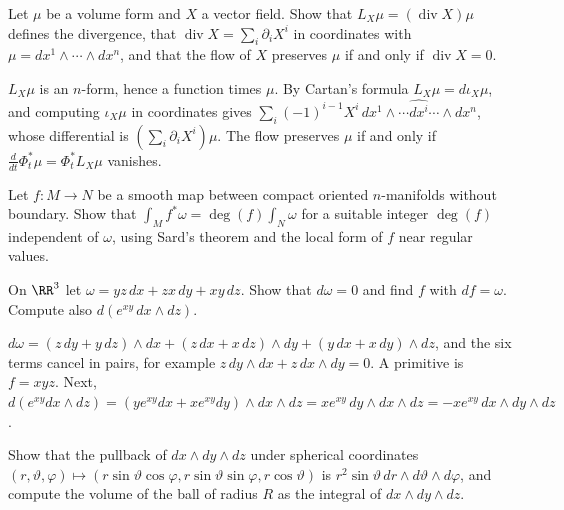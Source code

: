 \begin{exercise}\label{differential-forms:exercise-lie-derivative-volume}
Let $\mu$ be a volume form and $X$ a vector field. Show that $L_X\mu = (\operatorname{div}X)\mu$ defines the divergence, that $\operatorname{div}X = \sum_i\partial_iX^i$ in coordinates with
$\mu = dx^1 \wedge \cdots \wedge dx^n$, and that the flow of $X$ preserves $\mu$ if and only if $\operatorname{div}X = 0$.
\end{exercise}

\begin{solution}
$L_X\mu$ is an $n$-form, hence a function times $\mu$. By Cartan's formula $L_X\mu = d\iota_X\mu$, and computing $\iota_X\mu$ in coordinates gives $\sum_i(-1)^{i-1}X^i\,dx^1 \wedge \cdots \widehat{dx^i} \cdots \wedge dx^n$,
whose differential is $(\sum_i\partial_iX^i)\mu$. The flow preserves $\mu$ if and only if $\frac{d}{dt}\Phi_t^*\mu = \Phi_t^*L_X\mu$ vanishes.
\end{solution}

\begin{exercise}\label{differential-forms:exercise-stokes-degree}
Let $f \colon M \to N$ be a smooth map between compact oriented $n$-manifolds without boundary. Show that $\int_Mf^*\omega = \deg(f)\int_N\omega$ for a suitable integer $\deg(f)$ independent of $\omega$, using
Sard's theorem and the local form of $f$ near regular values.
\end{exercise}

\begin{exercise}\label{differential-forms:exercise-exact-primitive}
On $\RR^3$ let $\omega = yz\,dx + zx\,dy + xy\,dz$. Show that $d\omega = 0$ and find $f$ with $df = \omega$. Compute also $d(e^{xy}\,dx \wedge dz)$.
\end{exercise}

\begin{solution}
$d\omega = (z\,dy + y\,dz) \wedge dx + (z\,dx + x\,dz) \wedge dy + (y\,dx + x\,dy) \wedge dz$, and the six terms cancel in pairs, for example $z\,dy \wedge dx + z\,dx \wedge dy = 0$. A primitive is
$f = xyz$. Next, $d(e^{xy}dx \wedge dz) = (ye^{xy}dx + xe^{xy}dy) \wedge dx \wedge dz = xe^{xy}\,dy \wedge dx \wedge dz = -xe^{xy}\,dx \wedge dy \wedge dz$.
\end{solution}

\begin{exercise}\label{differential-forms:exercise-spherical-volume}
Show that the pullback of $dx \wedge dy \wedge dz$ under spherical coordinates $(r, \vartheta, \varphi) \mapsto (r\sin\vartheta\cos\varphi, r\sin\vartheta\sin\varphi, r\cos\vartheta)$ is
$r^2\sin\vartheta\,dr \wedge d\vartheta \wedge d\varphi$, and compute the volume of the ball of radius $R$ as the integral of $dx \wedge dy \wedge dz$.
\end{exercise}

